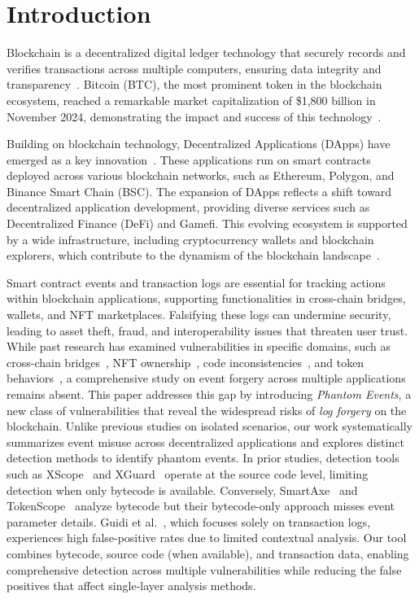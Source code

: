 \section{Introduction}
\label{Sec:Introduction}

Blockchain is a decentralized digital ledger technology that securely records and verifies transactions across multiple computers, ensuring data integrity and transparency~\cite{bitcoin}. Bitcoin (BTC), the most prominent token in the blockchain ecosystem, reached a remarkable market capitalization of \$1,800 billion in November 2024, demonstrating the impact and success of this technology~\cite{coinmarketcap}.


Building on blockchain technology, Decentralized Applications (DApps) have emerged as a key innovation~\cite{buterin2014next}. These applications run on smart contracts deployed across various blockchain networks, such as Ethereum, Polygon, and Binance Smart Chain (BSC). The expansion of DApps reflects a shift toward decentralized application development, providing diverse services such as Decentralized Finance (DeFi) and Gamefi. This evolving ecosystem is supported by a wide infrastructure, including cryptocurrency wallets and blockchain explorers, which contribute to the dynamism of the blockchain landscape~\cite{tang2022blockchain}.

Smart contract events and transaction logs are essential for tracking actions within blockchain applications, supporting functionalities in cross-chain bridges, wallets, and NFT marketplaces. Falsifying these logs can undermine security, leading to asset theft, fraud, and interoperability issues that threaten user trust. While past research has examined vulnerabilities in specific domains, such as cross-chain bridges~\cite{Xscope,liao2024smartaxe,wang2024xguard}, NFT ownership~\cite{sleepminting}, code inconsistencies~\cite{doccon}, and token behaviors~\cite{TokenScope}, a comprehensive study on event forgery across multiple applications remains absent. This paper addresses this gap by introducing \emph{Phantom Events}, a new class of vulnerabilities that reveal the widespread risks of \emph{log forgery} on the blockchain. Unlike previous studies on isolated scenarios, our work systematically summarizes event misuse across decentralized applications and explores distinct detection methods to identify phantom events. In prior studies, detection tools such as XScope~\cite{Xscope} and XGuard~\cite{wang2024xguard} operate at the source code level, limiting detection when only bytecode is available. Conversely, SmartAxe~\cite{liao2024smartaxe} and TokenScope~\cite{TokenScope} analyze bytecode but their bytecode-only approach misses event parameter details. Guidi et al.~\cite{sleepminting}, which focuses solely on transaction logs, experiences high false-positive rates due to limited contextual analysis. Our tool combines bytecode, source code (when available), and transaction data, enabling comprehensive detection across multiple vulnerabilities while reducing the false positives that affect single-layer analysis methods.

